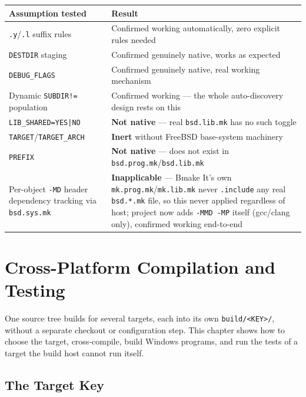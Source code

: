 \documentclass[11pt]{report}
\begin{document}
\begin{center}
\begin{longtable}{p{}p{}}
\toprule
Assumption tested & Result \\
\midrule
\endhead
\verb|.y|/\verb|.l| suffix rules & Confirmed working automatically, zero explicit rules needed \\
\verb|DESTDIR| staging & Confirmed genuinely native, works as expected \\
\verb|DEBUG_FLAGS| & Confirmed genuinely native, real working mechanism \\
Dynamic \verb|SUBDIR!=| population & Confirmed working — the whole auto-discovery design rests on this \\
\verb!LIB_SHARED=YES|NO! & \textbf{Not native} — real \verb|bsd.lib.mk| has no such toggle \\
\verb|TARGET|/\verb|TARGET_ARCH| & \textbf{Inert} without FreeBSD base-system machinery \\
\verb|PREFIX| & \textbf{Not native} — does not exist in \verb|bsd.prog.mk|/\verb|bsd.lib.mk| \\
Per-object \verb|-MD| header dependency tracking via \verb|bsd.sys.mk| & \textbf{Inapplicable} — Bmake It's own \verb|mk.prog.mk|/\verb|mk.lib.mk| never \verb|.include| any real \verb|bsd.*.mk| file, so this never applied regardless of host; project now adds \verb|-MMD -MP| itself (gcc/clang only), confirmed working end-to-end \\
\bottomrule
\end{longtable}
\end{center}

\chapter{Cross-Platform Compilation and Testing}
\label{ch:cross}

One source tree builds for several targets, each into its own
\verb|build/<KEY>/|, without a separate checkout or configuration step.
This chapter shows how to choose the target, cross-compile, build
Windows programs, and run the tests of a target the build host cannot
run itself.

\section{The Target Key}
\end{document}
